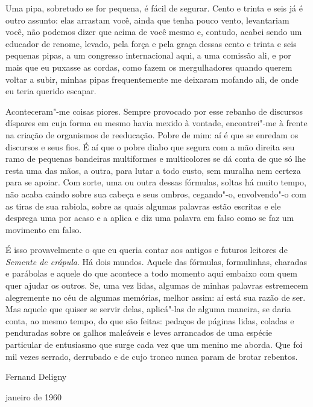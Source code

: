 Uma pipa, sobretudo se for pequena, é fácil de segurar. Cento e trinta e
seis já é outro assunto: elas arrastam você, ainda que tenha pouco
vento, levantariam você, não podemos dizer que acima de você mesmo e,
contudo, acabei sendo um educador de renome, levado, pela força e pela
graça dessas cento e trinta e seis pequenas pipas, a um congresso
internacional aqui, a uma comissão ali, e por mais que eu puxasse as
cordas, como fazem os mergulhadores quando querem voltar a subir, minhas
pipas frequentemente me deixaram mofando ali, de onde eu teria querido
escapar.

Aconteceram"-me coisas piores. Sempre provocado por esse rebanho de
discursos díspares em cuja forma eu mesmo havia mexido à vontade,
encontrei"-me à frente na criação de organismos de reeducação. Pobre de
mim: aí é que se enredam os discursos e seus fios. É aí que o pobre
diabo que segura com a mão direita seu ramo de pequenas bandeiras
multiformes e multicolores se dá conta de que só lhe resta uma das mãos,
a outra, para lutar a todo custo, sem muralha nem certeza para se
apoiar. Com sorte, uma ou outra dessas fórmulas, soltas há muito tempo,
não acaba caindo sobre sua cabeça e seus ombros, cegando"-o, envolvendo"-o
com as tiras de sua rabiola, sobre as quais algumas palavras estão
escritas e ele desprega uma por acaso e a aplica e diz uma palavra em
falso como se faz um movimento em falso.

É isso provavelmente o que eu queria contar aos antigos e futuros
leitores de \emph{Semente de crápula}. Há dois mundos. Aquele das
fórmulas, formulinhas, charadas e parábolas e aquele do que acontece a
todo momento aqui embaixo com quem quer ajudar os outros. Se, uma vez
lidas, algumas de minhas palavras estremecem alegremente no céu de
algumas memórias, melhor assim: aí está sua razão de ser. Mas aquele que
quiser se servir delas, aplicá"-las de alguma maneira, se daria conta, ao
mesmo tempo, do que são feitas: pedaços de páginas lidas, coladas e
penduradas sobre os galhos maleáveis e leves arrancados de uma espécie
particular de entusiasmo que surge cada vez que um menino me aborda. Que
foi mil vezes serrado, derrubado e de cujo tronco nunca param de brotar
rebentos.

\hfill{}Fernand Deligny

\hfill{}janeiro de 1960

\pagebreak